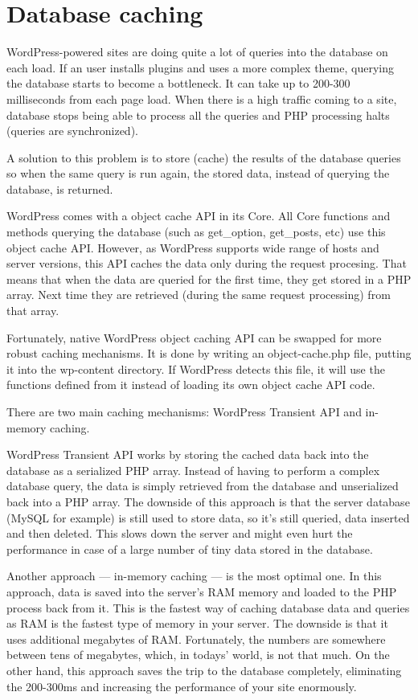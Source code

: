 \section{Database caching}

WordPress-powered sites are doing quite a lot of queries into the database on each load. If an user installs plugins and uses a more complex theme, querying the database starts to become a bottleneck. It can take up to 200-300 milliseconds from each page load. When there is a high traffic coming to a site, database stops being able to process all the queries and PHP processing halts (queries are synchronized).

A solution to this problem is to store (cache) the results of the database queries so when the same query is run again, the stored data, instead of querying the database, is returned.

WordPress comes with a object cache API in its Core. All Core functions and methods querying the database (such as get\_option, get\_posts, etc) use this object cache API. However, as WordPress supports wide range of hosts and server versions, this API caches the data only during the request procesing. That means that when the data are queried for the first time, they get stored in a PHP array. Next time they are retrieved (during the same request processing) from that array.

Fortunately, native WordPress object caching API can be swapped for more robust caching mechanisms. It is done by writing an object-cache.php file, putting it into the wp-content directory. If WordPress detects this file, it will use the functions defined from it instead of loading its own object cache API code.

There are two main caching mechanisms: WordPress Transient API and in-memory caching.

WordPress Transient API works by storing the cached data back into the database as a serialized PHP array. Instead of having to perform a complex database query, the data is simply retrieved from the database and unserialized back into a PHP array. The downside of this approach is that the server database (MySQL for example) is still used to store data, so it's still queried, data inserted and then deleted. This slows down the server and might even hurt the performance in case of a large number of tiny data stored in the database.

Another approach — in-memory caching — is the most optimal one. In this approach, data is saved into the server's RAM memory and loaded to the PHP process back from it. This is the fastest way of caching database data and queries as RAM is the fastest type of memory in your server. The downside is that it uses additional megabytes of RAM. Fortunately, the numbers are somewhere between tens of megabytes, which, in todays' world, is not that much. On the other hand, this approach saves the trip to the database completely, eliminating the 200-300ms and increasing the performance of your site enormously.

